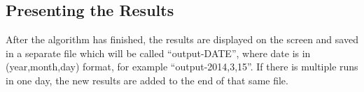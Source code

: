\documentclass{pdfmx4020}
\begin{document}
    \subsection{Presenting the Results} %
    \label{sub:presenting_the_results}
    After the algorithm has finished, the results are displayed on the screen and saved in a separate file which will be called ``output-DATE'', where date is in (year,month,day) format, for example ``output-2014,3,15''. If there is multiple runs in one day, the new results are added to the end of that same file.


  

  

  

  

  
\end{document}
